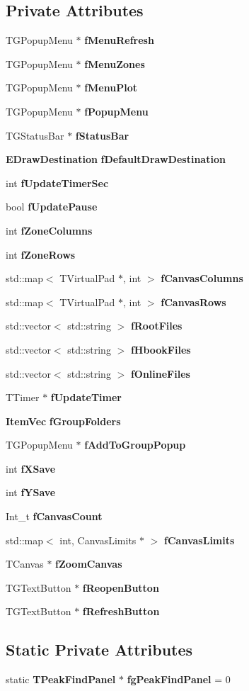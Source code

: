 \subsection*{Private Attributes}
\begin{DoxyCompactItemize}
\item 
TGPopupMenu $\ast$ {\bf fMenuRefresh}
\item 
TGPopupMenu $\ast$ {\bf fMenuZones}
\item 
TGPopupMenu $\ast$ {\bf fMenuPlot}
\item 
TGPopupMenu $\ast$ {\bf fPopupMenu}
\item 
TGStatusBar $\ast$ {\bf fStatusBar}
\item 
{\bf EDrawDestination} {\bf fDefaultDrawDestination}
\item 
int {\bf fUpdateTimerSec}
\item 
bool {\bf fUpdatePause}
\item 
int {\bf fZoneColumns}
\item 
int {\bf fZoneRows}
\item 
std::map$<$ TVirtualPad $\ast$, int $>$ {\bf fCanvasColumns}
\item 
std::map$<$ TVirtualPad $\ast$, int $>$ {\bf fCanvasRows}
\item 
std::vector$<$ std::string $>$ {\bf fRootFiles}
\item 
std::vector$<$ std::string $>$ {\bf fHbookFiles}
\item 
std::vector$<$ std::string $>$ {\bf fOnlineFiles}
\item 
TTimer $\ast$ {\bf fUpdateTimer}
\item 
{\bf ItemVec} {\bf fGroupFolders}
\item 
TGPopupMenu $\ast$ {\bf fAddToGroupPopup}
\item 
int {\bf fXSave}
\item 
int {\bf fYSave}
\item 
Int\_\-t {\bf fCanvasCount}
\item 
std::map$<$ int, CanvasLimits $\ast$ $>$ {\bf fCanvasLimits}
\item 
TCanvas $\ast$ {\bf fZoomCanvas}
\item 
TGTextButton $\ast$ {\bf fReopenButton}
\item 
TGTextButton $\ast$ {\bf fRefreshButton}
\end{DoxyCompactItemize}
\subsection*{Static Private Attributes}
\begin{DoxyCompactItemize}
\item 
static {\bf TPeakFindPanel} $\ast$ {\bf fgPeakFindPanel} = 0
\end{DoxyCompactItemize}


